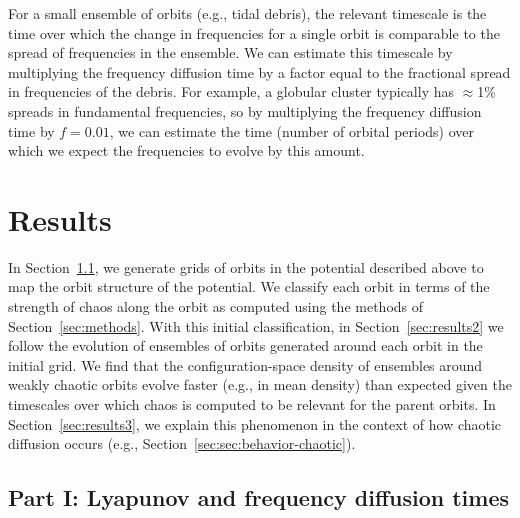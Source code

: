 \documentclass[letterpaper,12pt,preprint]{aastex}
\begin{document}
For a small ensemble of orbits (e.g., tidal debris), the relevant timescale is the time over which the change in frequencies for a single orbit is comparable to the spread of frequencies in the ensemble. We can estimate this timescale by multiplying the frequency diffusion time by a factor equal to the fractional spread in frequencies of the debris. For example, a globular cluster typically has $\approx$1\% spreads in fundamental frequencies, so by multiplying the frequency diffusion time by $f = 0.01$, we can estimate the time (number of orbital periods) over which we expect the frequencies to evolve by this amount.

%
\section{Results}

In Section~\ref{sec:results1}, we generate grids of orbits in the potential described above to map the orbit structure of the potential. We classify each orbit in terms of the strength of chaos along the orbit as computed using the methods of Section~\ref{sec:methods}. With this initial classification, in Section~\ref{sec:results2} we follow the evolution of ensembles of orbits generated around each orbit in the initial grid. We find that the configuration-space density of ensembles around weakly chaotic orbits evolve faster (e.g., in mean density) than expected given the timescales over which chaos is computed to be relevant for the parent orbits. In Section~\ref{sec:results3}, we explain this phenomenon in the context of how chaotic diffusion occurs (e.g., Section~\ref{sec:sec:behavior-chaotic}).

\subsection{Part I: Lyapunov and frequency diffusion times}\label{sec:results1}
\end{document}
